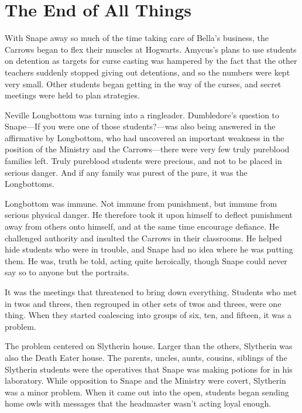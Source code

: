 
\chapter{The End of All Things}

With Snape away so much of the time taking care of Bella's business, the Carrows began to flex their muscles at Hogwarts. Amycus's plans to use students on detention as targets for curse casting was hampered by the fact that the other teachers suddenly stopped giving out detentions, and so the numbers were kept very small. Other students began getting in the way of the curses, and secret meetings were held to plan strategies.

Neville Longbottom was turning into a ringleader. Dumbledore's question to Snape—If you were one of those students?—was also being answered in the affirmative by Longbottom, who had uncovered an important weakness in the position of the Ministry and the Carrows—there were very few truly pureblood families left. Truly pureblood students were precious, and not to be placed in serious danger. And if any family was purest of the pure, it was the Longbottoms.

Longbottom was immune. Not immune from punishment, but immune from serious physical danger. He therefore took it upon himself to deflect punishment away from others onto himself, and at the same time encourage defiance. He challenged authority and insulted the Carrows in their classrooms. He helped hide students who were in trouble, and Snape had no idea where he was putting them. He was, truth be told, acting quite heroically, though Snape could never say so to anyone but the portraits.

It was the meetings that threatened to bring down everything. Students who met in twos and threes, then regrouped in other sets of twos and threes, were one thing. When they started coalescing into groups of six, ten, and fifteen, it was a problem.

The problem centered on Slytherin house. Larger than the others, Slytherin was also the Death Eater house. The parents, uncles, aunts, cousins, siblings of the Slytherin students were the operatives that Snape was making potions for in his laboratory. While opposition to Snape and the Ministry were covert, Slytherin was a minor problem. When it came out into the open, students began sending home owls with messages that the headmaster wasn't acting loyal enough.

